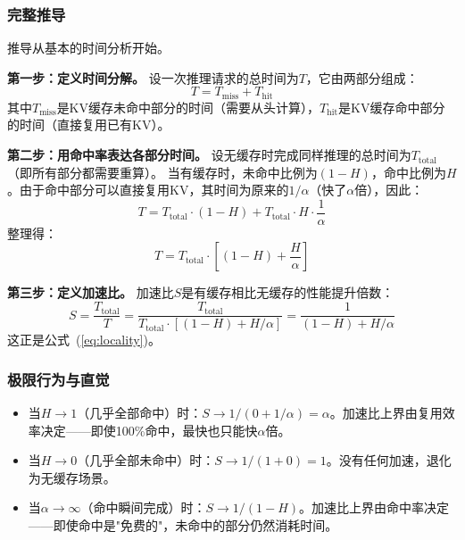 \subsubsection{完整推导}

推导从基本的时间分析开始。

\textbf{第一步：定义时间分解。}
设一次推理请求的总时间为$T$，它由两部分组成：
\begin{equation}
T = T_{\mathrm{miss}} + T_{\mathrm{hit}}
\end{equation}
其中$T_{\mathrm{miss}}$是KV缓存未命中部分的时间（需要从头计算），$T_{\mathrm{hit}}$是KV缓存命中部分的时间（直接复用已有KV）。

\textbf{第二步：用命中率表达各部分时间。}
设无缓存时完成同样推理的总时间为$T_{\mathrm{total}}$（即所有部分都需要重算）。
当有缓存时，未命中比例为$(1-H)$，命中比例为$H$。由于命中部分可以直接复用KV，其时间为原来的$1/\alpha$（快了$\alpha$倍），因此：
\begin{equation}
T = T_{\mathrm{total}} \cdot (1-H) + T_{\mathrm{total}} \cdot H \cdot \frac{1}{\alpha}
\end{equation}
整理得：
\begin{equation}
T = T_{\mathrm{total}} \cdot \left[(1-H) + \frac{H}{\alpha}\right]
\end{equation}

\textbf{第三步：定义加速比。}
加速比$S$是有缓存相比无缓存的性能提升倍数：
\begin{equation}
S = \frac{T_{\mathrm{total}}}{T} = \frac{T_{\mathrm{total}}}{T_{\mathrm{total}} \cdot \left[(1-H) + H/\alpha\right]} = \frac{1}{(1-H) + H/\alpha}
\end{equation}
这正是公式~(\ref{eq:locality})。

\subsubsection{极限行为与直觉}

\begin{itemize}[nosep]
\item 当$H \to 1$（几乎全部命中）时：$S \to 1/(0 + 1/\alpha) = \alpha$。加速比上界由复用效率决定——即使100\%命中，最快也只能快$\alpha$倍。
\item 当$H \to 0$（几乎全部未命中）时：$S \to 1/(1 + 0) = 1$。没有任何加速，退化为无缓存场景。
\item 当$\alpha \to \infty$（命中瞬间完成）时：$S \to 1/(1-H)$。加速比上界由命中率决定——即使命中是"免费的"，未命中的部分仍然消耗时间。
\end{itemize}

